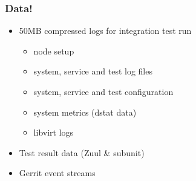 \documentclass[aspectratio=169,11pt,hyperref={colorlinks=true}]{beamer}
\begin{document}
\begin{frame}
    \frametitle{Data!}
    \begin{itemize}
        \item{50MB compressed logs for integration test run}
        \begin{itemize}
            \item{node setup}
            \item{system, service and test log files}
            \item{system, service and test configuration}
            \item{system metrics (dstat data)}
            \item{libvirt logs}
        \end{itemize}
        \item{Test result data (Zuul \& subunit)}
        \item{Gerrit event streams}
    \end{itemize}
\end{frame}

\end{document}
